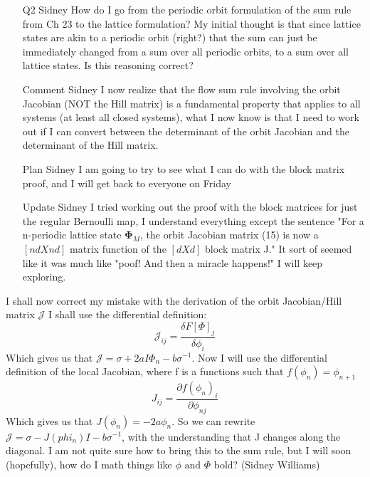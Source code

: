 {\begin{itemize}
\item[Q2 Sidney]
How do I go from the periodic orbit formulation of the sum rule from Ch 23 to the lattice formulation? My initial thought is that since lattice states are akin to a periodic orbit (right?) that the sum can just be immediately changed from a sum over all periodic orbits, to a sum over all lattice states. Is this reasoning correct? 

\item[Comment Sidney]
I now realize that the flow sum rule involving the orbit Jacobian (NOT the Hill matrix) is a fundamental property that applies to all systems (at least all closed systems), what I now know is that I need to work out if I can convert between the determinant of the orbit Jacobian and the determinant of the Hill matrix. 

\item[Plan Sidney]
I am going to try to see what I can do with the block matrix proof, and I will get back to everyone on Friday

\item[Update Sidney]
I tried working out the proof with the block matrices for just the regular Bernoulli map, I understand everything except the sentence "For a n-periodic lattice state $\mathbf{\Phi}_M$, the orbit Jacobian matrix (15) is now a $[ndXnd]$ matrix function of the $[dXd]$ block matrix J." It sort of seemed like it was much like "poof! And then a miracle happens!" I will keep exploring.
\end{itemize}

I shall now correct my mistake with the derivation of the orbit Jacobian/Hill matrix $\mathcal{J}$ I shall use the differential definition:
$$\mathcal{J}_{ij}=\frac{\delta F[\Phi]_j}{\delta\phi_i}$$
Which gives us that $\mathcal{J}=\sigma+2aI\Phi_n-b\sigma^{-1}$. Now I will use the differential definition of the local Jacobian, where f is a functions such that $f(\phi_n)=\phi_{n+1}$
$$J_{ij}=\frac{\partial f(\phi_n)_i}{\partial \phi_{nj}}$$
Which gives us that $J(\phi_n)=-2a\phi_n$. So we can rewrite $\mathcal{J}=\sigma-J(phi_n)I-b\sigma^{-1}$, with the understanding that J changes along the diagonal. I am not quite sure how to bring this to the sum rule, but I will soon (hopefully), how do I math things like $\phi\text{ and }\Phi$ bold?
\hfill (Sidney Williams) %
    } %
